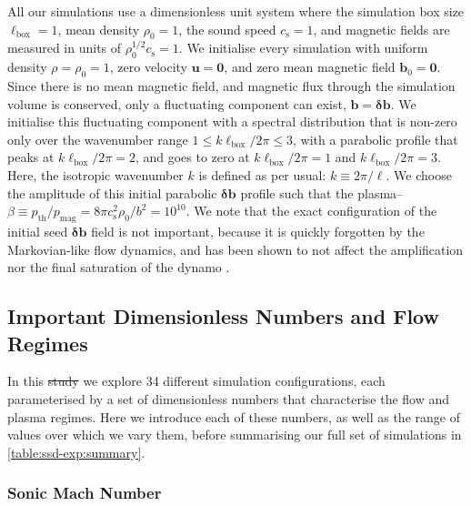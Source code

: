 \documentclass[12pt,twoside]{extreport}
\makeatletter
\newcommand{\mVector}[1]{\bm{#1}} %
\providecommand{\DIFaddtex}[1]{{\protect\color{DIFgreen}\uwave{#1}}} %
\providecommand{\DIFdeltex}[1]{{\protect\color{DIFpurple}\sout{#1}}} %
\providecommand{\DIFaddbegin}{} %
\providecommand{\DIFaddend}{} %
\providecommand{\DIFdelbegin}{} %
\providecommand{\DIFdelend}{} %
\providecommand{\DIFadd}[1]{\texorpdfstring{\DIFaddtex{#1}}{#1}} %
\providecommand{\DIFdel}[1]{\texorpdfstring{\DIFdeltex{#1}}{}} %
\providecommand{\DIFscaledelfig}{0.5}
\newlength{\DIFdelgraphicswidth} %
\newlength{\DIFdelgraphicsheight} %
\providecommand{\DIFaddincludegraphics}[2][]{{\color{DIFgreen}\fbox{\DIFOincludegraphics[#1]{#2}}}} %
\providecommand{\DIFdelincludegraphics}[2][]{%
\sbox{\DIFdelgraphicsbox}{\DIFOincludegraphics[#1]{#2}}%
\settoboxwidth{\DIFdelgraphicswidth}{\DIFdelgraphicsbox} %
\settoboxtotalheight{\DIFdelgraphicsheight}{\DIFdelgraphicsbox} %
\scalebox{\DIFscaledelfig}{%
\parbox[b]{\DIFdelgraphicswidth}{\usebox{\DIFdelgraphicsbox}\\[-\baselineskip] \rule{\DIFdelgraphicswidth}{0em}}\llap{\resizebox{\DIFdelgraphicswidth}{\DIFdelgraphicsheight}{%
\setlength{\unitlength}{\DIFdelgraphicswidth}%
\begin{picture}(1,1)%
\thicklines\linethickness{2pt} %
{\color{DIFpurple}\put(0,0){\framebox(1,1){}}}%
{\color{DIFpurple}\put(0,0){\line( 1,1){1}}}%
{\color{DIFpurple}\put(0,1){\line(1,-1){1}}}%
\end{picture}%
}\hspace*{3pt}}} %
} %
\DeclareRobustCommand{\DIFaddbegin}{\DIFOaddbegin \let\includegraphics\DIFaddincludegraphics} %
\DeclareRobustCommand{\DIFaddend}{\DIFOaddend \let\includegraphics\DIFOincludegraphics} %
\DeclareRobustCommand{\DIFdelbegin}{\DIFOdelbegin \let\includegraphics\DIFdelincludegraphics} %
\DeclareRobustCommand{\DIFdelend}{\DIFOaddend \let\includegraphics\DIFOincludegraphics} %
\let\sout@orig\sout %
\renewcommand{\sout}[1]{\ifmmode\text{\sout@orig{\ensuremath{#1}}}\else\sout@orig{#1}\fi} %
\makeatother
\begin{document}
All our simulations use a dimensionless unit system where the simulation box size $\ell_\mathrm{box} = 1$, mean density $\rho_0 = 1$, the sound speed $c_\mathrm{s} = 1$, and magnetic fields are measured in units of $\rho_0^{1/2} c_\mathrm{s} = 1$. We initialise every simulation with uniform density $\rho = \rho_0 = 1$, zero velocity $\mVector{u} = \mVector{0}$, and zero mean magnetic field $\mVector{b}_0 = \mVector{0}$. Since there is no mean magnetic field, and magnetic flux through the simulation volume is conserved, only a fluctuating component can exist, $\mVector{b} = \mVector{\delta b}$. We initialise this fluctuating component with a spectral distribution \citep[using \mbox{\textsc{TurbGen}};][]{Federrath2022_TurbGen} that is non-zero only over the wavenumber range $1 \leq k \ell_\mathrm{box} / 2\pi \leq 3$, with a parabolic profile that peaks at $k \ell_\mathrm{box}/2\pi = 2$, and goes to zero at $k \ell_\mathrm{box}/2\pi = 1$ and $k \ell_\mathrm{box}/2\pi = 3$. Here, the isotropic wavenumber $k$ is defined as per usual: $k \equiv 2\pi / \ell$. We choose the amplitude of this initial parabolic $\mVector{\delta b}$ profile such that the plasma--$\beta \equiv p_\mathrm{th}/p_\mathrm{mag} = 8\pi c_\mathrm{s}^2 \rho_0 / b^2 = 10^{10}$. We note that the exact configuration of the initial seed $\mVector{\delta b}$ field is not important, because it is quickly forgotten by the Markovian-like flow dynamics, and has been shown to not affect the amplification nor the final saturation of the dynamo \citep{seta2020seed, bott2022insensitivity, beattie2022growth}.

\subsection{Important Dimensionless Numbers and Flow Regimes}
\label{sec:ICs}

In this \DIFdelbegin \DIFdel{study }\DIFdelend \DIFaddbegin \DIFadd{chapter }\DIFaddend we explore 34 different simulation configurations, each parameterised by a set of dimensionless numbers that characterise the flow and plasma regimes. Here we introduce each of these numbers, as well as the range of values over which we vary them, before summarising our full set of simulations in \autoref{table:ssd-exp:summary}.

\subsubsection{Sonic Mach Number}
\label{sec:ICs:Mach}
\end{document}
